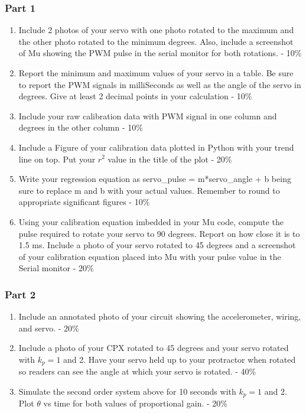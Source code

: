 

\subsubsection{Part 1}
\begin{enumerate}[itemsep=-5pt]
\item Include 2 photos of your servo with one photo rotated to the maximum and the other photo rotated to the minimum degrees. Also, include a screenshot of Mu showing the PWM pulse in the serial monitor for both rotations. - 10\%
\item Report the minimum and maximum values of your servo in a table. Be sure to report the PWM signals in milliSeconds as well as the angle of the servo in degrees. Give at least 2 decimal points in your calculation - 10\%
\item Include your raw calibration data with PWM signal in one column and degrees in the other column - 10\%
\item Include a Figure of your calibration data plotted in Python with your trend line on top. Put your $r^2$ value in the title of the plot - 20\%
\item Write your regression equation as servo\_pulse = m*servo\_angle + b being sure to replace m and b with your actual values. Remember to round to appropriate significant figures - 10\% 
\item Using your calibration equation imbedded in your Mu code, compute the pulse required to rotate your servo to 90 degrees. Report on how close it is to 1.5 ms. Include a photo of your servo rotated to 45 degrees and a screenshot of your calibration equation placed into Mu with your pulse value in the Serial monitor - 20\%
\end{enumerate}

\subsubsection{Part 2}
\begin{enumerate}[itemsep=-5pt]
\item Include an annotated photo of your circuit showing the accelerometer, wiring, and servo. - 20\%
\item Include a photo of your CPX rotated to 45 degrees and your servo rotated with $k_p=1$ and 2. Have your servo held up to your protractor when rotated so readers can see the angle at which your servo is rotated. - 40\%
\item Simulate the second order system above for 10 seconds with $k_p=1$ and 2. Plot $\theta$ vs time for both values of proportional gain. - 20\%
\end{enumerate}
